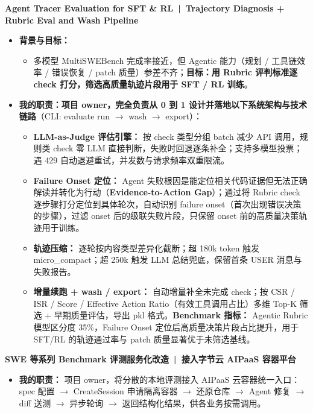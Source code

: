 \documentclass[10pt]{article}
\newcommand{\code}[1]{\colorbox{codegray}{\small\ttfamily #1}}
\newcommand{\ptitle}[1]{\vspace{2pt}\par{\color{accent}\sffamily\bfseries #1}\par\vspace{1pt}}
\begin{document}
\ptitle{Agent Tracer Evaluation for SFT \& RL~|~Trajectory Diagnosis + Rubric Eval and Wash Pipeline}
\begin{itemize}
\item \textbf{背景与目标：}
  \begin{itemize}[label=$\circ$]
  \item 多模型 MultiSWEBench 完成率接近，但 Agentic 能力（规划 / 工具链效率 / 错误恢复 / patch 质量）参差不齐；\textbf{目标：用 Rubric 评判标准逐 check 打分，筛选高质量轨迹片段用于 SFT / RL 训练}。
  \end{itemize}
\item \textbf{我的职责：项目 owner，完全负责从 0 到 1 设计并落地以下系统架构与技术链路}（CLI: \code{evaluate run $\rightarrow$ wash $\rightarrow$ export}）：
  \begin{itemize}[label=$\circ$]
  \item \textbf{LLM-as-Judge 评估引擎：} 按 check 类型分组 batch 减少 API 调用，规则类 check 零 LLM 直接判断，失败时回退逐条补全；支持多模型投票；遇 429 自动退避重试，并发数与请求频率双重限流。
  \item \textbf{Failure Onset 定位：} Agent 失败根因是能定位相关代码证据但无法正确解读并转化为行动（\textbf{Evidence-to-Action Gap}）；通过将 Rubric check 逐步骤打分定位到具体轮次，自动识别 failure onset（首次出现错误决策的步骤），过滤 onset 后的级联失败片段，只保留 onset 前的高质量决策轨迹用于训练。
  \item \textbf{轨迹压缩：} 逐轮按内容类型差异化截断；超 180k token 触发 \code{micro\_compact}；超 250k 触发 LLM 总结兜底，保留首条 USER 消息与失败报告。
  \item \textbf{增量续跑 + wash / export：} 自动增量补全未完成 check；按 CSR / ISR / Score / Effective Action Ratio（有效工具调用占比）多维 Top-K 筛选 + 早期质量评估，导出 pkl 格式。\textbf{Benchmark 指标：} Agentic Rubric 模型区分度 35\%，Failure Onset 定位后高质量决策片段占比提升，用于 SFT/RL 的轨迹通过率与 patch 质量显著优于未筛选基线。
  \end{itemize}
\end{itemize}

\ptitle{SWE 等系列 Benchmark 评测服务化改造~|~接入字节云 AIPaaS 容器平台}
\begin{itemize}
\item \textbf{我的职责：} 项目 owner，将分散的本地评测接入 AIPaaS 云容器统一入口：spec 配置 $\rightarrow$ \code{CreateSession} 申请隔离容器 $\rightarrow$ 还原仓库 $\rightarrow$ Agent 修复 $\rightarrow$ diff 送测 $\rightarrow$ 异步轮询 $\rightarrow$ 返回结构化结果，供各业务按需调用。
\end{itemize}
\end{document}
